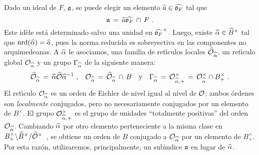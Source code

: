 \begin{obsGruposYOrdenesAsociadosAUnaClaseEstricta}%
	\label{obs:gruposyordenesasociadosaunaclaseestricta}
	Dado un ideal de $F$, $\frak{a}$, se puede elegir un elemento
	$\hhat{a}\in\Adfin{\oka{F}}$ tal que
	\begin{equation}
		\label{eq:ideleintegroasociado}
		\frak{a} \,=\,\hhat{a}\Adfin{\oka{F}}\,\cap\,F
		\text{ .}
	\end{equation}
	Este id\`{e}le est\'{a} determinado salvo una unidad en
	$\Idfin{\oka{F}}$. Luego, existe $\hhat{\alpha}\in\Idfin{B}$ tal que
	$\nrd(\hhat{\alpha})=\hhat{a}$, pues la norma reducida es sobreyectiva
	en las componentes no arquimedeanas. A $\hhat{\alpha}$ le asociamos,
	una familia de ret\'{\i}culos locales
	$\Adfin{\cal{O}}_{\hhat{\alpha}}$, un ret\'{\i}culo global
	$\cal{O}_{\hhat{\alpha}}$ y un grupo $\Gamma_{\hhat{\alpha}}$ de la
	siguiente manera:
	\begin{equation}
		\label{eq:ordenasociadocuaterniones}
		\Adfin{\cal{O}}_{\hhat{\alpha}} \,=\,
			\hhat{\alpha}\Adfin{\cal{O}}\hhat{\alpha}^{-1}
			\text{ ,}\quad
		\cal{O}_{\hhat{\alpha}}\,=\,\Adfin{\cal{O}}_{\hhat{\alpha}}
			\,\cap\, B
			\quad\text{y}\quad
		\Gamma_{\hhat{\alpha}}\,=\,
			\cal{O}_{\hhat{\alpha},+}^{\times}\,=\,
			\cal{O}_{\hhat{\alpha}}^{\times}\cap B_{+}^{\times}
		\text{ .}
	\end{equation}
	El ret\'{\i}culo $\cal{O}_{\hhat{\alpha}}$ es un orden de Eichler
	de nivel igual al nivel de $\cal{O}$; ambos \'{o}rdenes son
	\emph{localmente} conjugados, pero no necesariamente conjugados por un
	elemento de $B^{\times}$. El grupo $\cal{O}_{\hhat{\alpha},+}^{\times}$
	es el grupo de unidades ``totalmente positivas'' del orden
	$\cal{O}_{\hhat{\alpha}}$. Cambiando $\hhat{\alpha}$ por otro elemento
	perteneciente a la misma clase en
	\begin{math}
		B_{+}^{\times}\backslash\Idfin{B}/\Idfin{\cal{O}}
	\end{math}~,
	se obtiene un orden de $B$ conjugado a $\cal{O}_{\hhat{\alpha}}$ por un
	elemento de $B_{+}^{\times}$. Por esta raz\'{o}n, utilizaremos,
	principalmente, un sub\'{\i}ndice $\frak{a}$ en lugar de
	$\hhat{\alpha}$.
\end{obsGruposYOrdenesAsociadosAUnaClaseEstricta}


